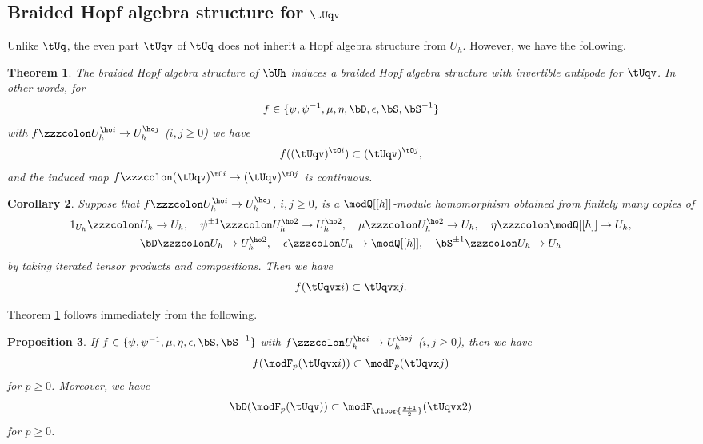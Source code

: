 \documentclass{amsart}
\numberwithin{equation}{section}
\numberwithin{figure}{section}
\theoremstyle{plain}
\newtheorem{theorem}{Theorem}[section]
\newtheorem{corollary}[theorem]{Corollary}
\newtheorem{proposition}[theorem]{Proposition}
\theoremstyle{definition}
\theoremstyle{remark}
\begin{document}
\subsection{Braided Hopf algebra structure for $\tUqv$}
\label{sec:braid-hopf-algebra}

Unlike $\tUq$, the even part $\tUqv$ of $\tUq$ does not inherit a Hopf
algebra structure from $U_h$.  However, we have the following.

\begin{theorem}
  \label{thm:26}
  The braided Hopf algebra structure of $\bUh$ induces a braided
  Hopf algebra structure with invertible antipode for $\tUqv$.  In
  other words, for
  \begin{equation*}
    f\in \{\psi ,\psi ^{-1},\mu ,\eta ,\bD,\epsilon ,\bS,\bS^{-1}\}
  \end{equation*}
  with $f\zzzcolon U_h^{\ho i}\rightarrow U_h^{\ho j}$ ($i,j\ge 0$) we have
  \begin{equation*}
    f((\tUqv)^{\tO i})\subset (\tUqv)^{\tO j},
  \end{equation*}
  and the induced map $f\zzzcolon (\tUqv)^{\tO i}\rightarrow (\tUqv)^{\tO j}$ is
  continuous.
\end{theorem}

\begin{corollary}
  \label{thm:20}
  Suppose that $f\zzzcolon U_h^{\ho i}\rightarrow U_h^{\ho j}$, $i,j\ge 0$, is a
  $\modQ [[h]]$-module homomorphism obtained from finitely many copies of
  \begin{gather*}
    1_{U_h}\zzzcolon U_h\rightarrow U_h,\quad \psi ^{\pm 1}\zzzcolon U_h^{\ho2}\rightarrow U_h^{\ho2},\quad
    \mu \zzzcolon U_h^{\ho2}\rightarrow U_h,\quad \eta \zzzcolon \modQ [[h]]\rightarrow U_h,\\
    \bD\zzzcolon U_h\rightarrow U_h^{\ho2},\quad \epsilon \zzzcolon U_h\rightarrow \modQ [[h]],\quad
    \bS^{\pm 1}\zzzcolon U_h\rightarrow U_h
  \end{gather*}
  by taking iterated tensor products and compositions.  Then we have
  \begin{equation*}
      f(\tUqvx i)\subset \tUqvx j.
  \end{equation*}
\end{corollary}

Theorem \ref{thm:26} follows immediately from the following.

\begin{proposition}
  \label{r51}
  If $f\in \{\psi ,\psi ^{-1},\mu ,\eta ,\epsilon ,\bS,\bS^{-1}\}$ with $f\zzzcolon U_h^{\ho
  i}\rightarrow U_h^{\ho j}$ ($i,j\ge 0$), then we have
  \begin{equation}
    f(\modF _p(\tUqvx i))\subset \modF _p(\tUqvx j)
  \end{equation}
  for $p\ge 0$.  Moreover, we have
  \begin{equation}
    \label{eq:39}
    \bD(\modF _p(\tUqv))\subset \modF _{\floor{\frac{p+1}2}}(\tUqvx2)
  \end{equation}
  for $p\ge 0$.
\end{proposition}
\end{document}
